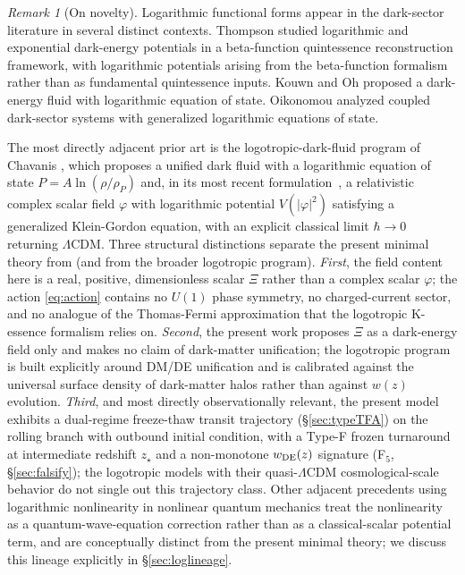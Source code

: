 \documentclass[11pt,reqno]{amsart}
\theoremstyle{plain}
\theoremstyle{definition}
\theoremstyle{remark}
\newtheorem*{remark}{Remark}
\begin{document}
\begin{remark}[On novelty]
Logarithmic functional forms appear in the dark-sector literature in
several distinct contexts. Thompson \cite{Thompson2019} studied
logarithmic and exponential dark-energy potentials in a beta-function
quintessence reconstruction framework, with logarithmic potentials
arising from the beta-function formalism rather than as fundamental
quintessence inputs. Kouwn and Oh \cite{KouwnOh2012} proposed a
dark-energy fluid with logarithmic equation of state. Oikonomou
\cite{Oikonomou2019} analyzed coupled dark-sector systems with
generalized logarithmic equations of state.

The most directly adjacent prior art is the logotropic-dark-fluid
program of Chavanis
\cite{Chavanis2015,Chavanis2021Kessence,Chavanis2022Logotropic}, which
proposes a unified dark fluid with a logarithmic equation of state
$P = A \ln(\rho/\rho_P)$ and, in its most recent
formulation~\cite{Chavanis2022Logotropic}, a relativistic complex
scalar field $\varphi$ with logarithmic potential $V(|\varphi|^{2})$
satisfying a generalized Klein-Gordon equation, with an explicit
classical limit $\hbar \to 0$ returning $\Lambda$CDM. Three structural
distinctions separate the present minimal theory from
\cite{Chavanis2022Logotropic} (and from the broader logotropic
program). \emph{First}, the field content here is a real, positive,
dimensionless scalar $\Xi$ rather than a complex scalar $\varphi$;
the action \eqref{eq:action} contains no $U(1)$ phase symmetry, no
charged-current sector, and no analogue of the Thomas-Fermi
approximation that the logotropic K-essence formalism
\cite{Chavanis2021Kessence} relies on. \emph{Second}, the present
work proposes $\Xi$ as a dark-energy field only and makes no claim of
dark-matter unification; the logotropic program is built explicitly
around DM/DE unification and is calibrated against the universal
surface density of dark-matter halos rather than against $w(z)$
evolution. \emph{Third}, and most directly observationally relevant,
the present model exhibits a dual-regime freeze-thaw transit
trajectory (\S\ref{sec:typeTFA}) on the rolling branch with outbound
initial condition, with a Type-F frozen turnaround at intermediate
redshift $z_\star$ and a non-monotone $w_{\rm DE}(z)$ signature
(F$_5$, \S\ref{sec:falsify}); the logotropic models with their
quasi-$\Lambda$CDM cosmological-scale behavior do not single out this
trajectory class. Other adjacent precedents using logarithmic
nonlinearity in nonlinear quantum mechanics
\cite{Zloshchastiev2010LogTime,Zloshchastiev2011SSB,AvdeenkovZloshchastiev2011,Zloshchastiev2018Stability,Zloshchastiev2020SuperfluidDM}
treat the nonlinearity as a quantum-wave-equation correction rather
than as a classical-scalar potential term, and are conceptually
distinct from the present minimal theory; we discuss this lineage
explicitly in \S\ref{sec:loglineage}.


\end{remark}
\end{document}
